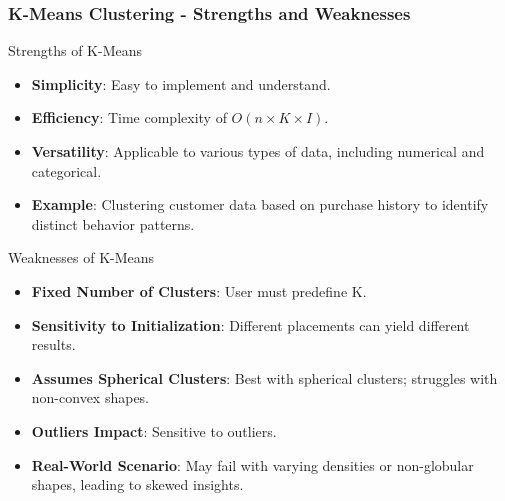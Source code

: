 \documentclass[aspectratio=169]{beamer}
\begin{document}
\begin{frame}[fragile]
    \frametitle{K-Means Clustering - Strengths and Weaknesses}
    \begin{block}{Strengths of K-Means}
        \begin{itemize}
            \item \textbf{Simplicity}: Easy to implement and understand.
            \item \textbf{Efficiency}: Time complexity of \(O(n \times K \times I)\).
            \item \textbf{Versatility}: Applicable to various types of data, including numerical and categorical.
            \item \textbf{Example}: Clustering customer data based on purchase history to identify distinct behavior patterns.
        \end{itemize}
    \end{block}
    
    \begin{block}{Weaknesses of K-Means}
        \begin{itemize}
            \item \textbf{Fixed Number of Clusters}: User must predefine K.
            \item \textbf{Sensitivity to Initialization}: Different placements can yield different results.
            \item \textbf{Assumes Spherical Clusters}: Best with spherical clusters; struggles with non-convex shapes.
            \item \textbf{Outliers Impact}: Sensitive to outliers.
            \item \textbf{Real-World Scenario}: May fail with varying densities or non-globular shapes, leading to skewed insights.
        \end{itemize}
    \end{block}
\end{frame}
\end{document}
